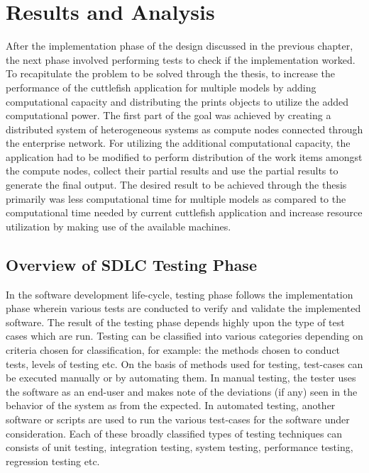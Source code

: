 \chapter{Results and Analysis}

After the implementation phase of the design discussed in the previous chapter, the next phase involved performing tests to check if the implementation worked. To recapitulate the problem to be solved through the thesis, to increase the performance of the cuttlefish application for multiple models by adding computational capacity and distributing the prints objects to utilize the added computational power. The first part of the goal was achieved by creating a distributed system of heterogeneous systems as compute nodes connected through the enterprise network. For utilizing the additional computational capacity, the application had to be modified to perform distribution of the work items amongst the compute nodes, collect their partial results and use the partial results to generate the final output. The desired result to be achieved through the thesis primarily was less computational time for multiple models as compared to the computational time needed by current cuttlefish application and increase resource utilization by making use of the available machines.\newline

\section{Overview of SDLC Testing Phase} \label{SDLCTesting}

In the software development life-cycle, testing phase follows the implementation phase wherein various tests are conducted to verify and validate the implemented software. The result of the testing phase depends highly upon the type of test cases which are run. Testing can be classified into various categories depending on criteria chosen for classification, for example: the methods chosen to conduct tests, levels of testing etc. On the basis of methods used for testing, test-cases can be executed manually or by automating them. In manual testing, the tester uses the software as an end-user and makes note of the deviations (if any) seen in the behavior of the system as from the expected. In automated testing, another software or scripts are used to run the various test-cases for the software under consideration. Each of these broadly classified types of testing techniques can consists of unit testing, integration testing, system testing, performance testing, regression testing etc.\newline

